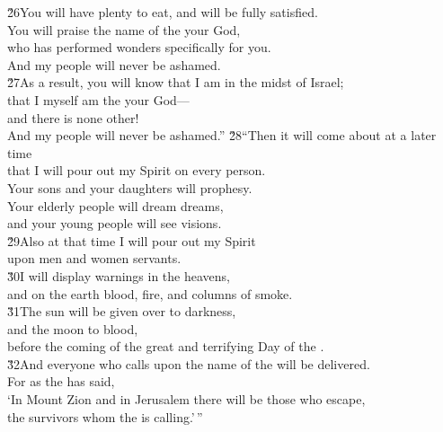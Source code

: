 \begin{poetry}
\poeml \v{26}You will have plenty to eat, and will be fully satisfied. \\
\poemll    You will praise the name of the  your God, \\
\poeml who has performed wonders specifically for you. \\
\poemll    And my people will never be ashamed. \\
\poeml \v{27}As a result, you will know that I am in the midst of Israel; \\
\poemll    that I myself am the  your God--- \\
\poemlll       and there is none other! \\
\poeml And my people will never be ashamed.''
\poeml \v{28}``Then it will come about at a later time \\
\poemll    that I will pour out my Spirit on every person. \\
\poeml Your sons and your daughters will prophesy. \\
\poemll    Your elderly people will dream dreams, \\
\poemlll       and your young people will see visions. \\
\poeml \v{29}Also at that time I will pour out my Spirit \\
\poemll    upon men and women servants. \\
\poeml \v{30}I will display warnings in the heavens, \\
\poemll    and on the earth blood, fire, and columns of smoke. \\
\poeml \v{31}The sun will be given over to darkness, \\
\poemll    and the moon to blood, \\
\poemlll       before the coming of the great and terrifying Day of the . \\
\poeml \v{32}And everyone who calls upon the name of the  will be delivered. \\
\poemll    For as the  has said, \\
\poemlll       `In Mount Zion and in Jerusalem there will be those who escape, \\
\poemlll       the survivors whom the  is calling.'\,''
\end{poetry}

